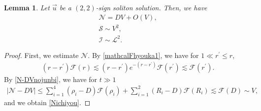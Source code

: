 \documentclass[reqno]{amsart}
\theoremstyle{plain}
\newtheorem{lemma}[theorem]{Lemma}
\theoremstyle{definition}
\numberwithin{equation}{section}
\begin{document}
\begin{lemma}\label{mathcalichiyou}
Let $\vec{u}$ be a $(2,2)$-sign soliton solution. Then, we have
\begin{align}
\mathcal{N}=DV+O(V),\label{Nichiyou}
\\
\mathcal{S}\sim V^2,\label{Sichiyou}
\\
\mathcal{I}\sim \mathcal{L}^2.\label{Lichiyou}
\end{align}
\end{lemma}
\begin{proof}
First, we estimate $\mathcal{N}$. By \eqref{mathcalFhyouka1}, we have for $1\ll r^{\prime}\leq r$,
\begin{align}\label{N-DVnojunbi}
\left(r-r^{\prime}\right)\mathcal{F}(r)\lesssim \left(r-r^{\prime}\right)e^{-(r-r^{\prime})}\mathcal{F}(r^{\prime})\lesssim \mathcal{F}(r^{\prime}).
\end{align}
By \eqref{N-DVnojunbi}, we have for $t\gg 1$
\begin{align*}
\left|\mathcal{N}-DV\right|\leq\sum_{i=1}^4 (\rho_i-D)\mathcal{F}(\rho_i)+\sum_{i=1}^2\left(R_i-D\right)\mathcal{F}(R_i)\lesssim \mathcal{F}(D)\sim V,
\end{align*}
and we obtain \eqref{Nichiyou}.


\end{proof}
\end{document}
